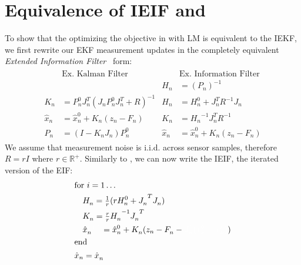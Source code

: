 

\section{Equivalence of IEIF and }
\label{app:ieif-lm}

To show that the optimizing the objective in  with LM is equivalent to the IEKF, we first rewrite our EKF measurement updates in the completely equivalent \emph{Extended Information Filter}~\cite{anderson1979optimal} form:
% 
\begin{gather*}
\begin{aligned}
&\text{Ex. Kalman Filter}                           &       &\text{Ex. Information Filter} \\
&                                                   &       H_n &= \left(P_n\right)^{-1} \\
K_n &= P_n^0 J_n^T(J_n P_n^0 J_n^T + R)^{-1}        &       H_n &= H_n^0 + J_n^T R^{-1} J_n \\
\hat{x}_n &= \hat{x}_n^0 + K_n(z_n - F_n)           &       K_n &= {H_n}^{-1} J_n^T R^{-1} \\
P_n &= (I - K_n J_n)P_n^0                           &       \hat{x}_n &= \hat{x}_n^0 + K_n (z_n - F_n)
\end{aligned}
\label{eq:ekf-eif}
\end{gather*}
%  
We assume that measurement noise is i.i.d. across sensor samples, therefore $R=rI$ where $r\in \mathbb{R}^+$. Similarly to , we can now write the IEIF, the iterated version of the EIF:
\begin{gather}
\begin{aligned}
&\text{for } i=1 \dots  \\
&\quad H_n^\textit{\color{accent}$i$} = \tfrac{1}{r} (r H_n^0 +{J_n^\textit{\color{accent}$i$}}^T J_n^\textit{\color{accent}$i$}) \\
&\quad K_n^\textit{\color{accent}$i$} =\tfrac{r}{r} {H_n^\textit{\color{accent}$i$}}^{-1} {J_n^\textit{\color{accent}$i$}}^T \\
&\quad \hat{x}_n^\textit{\color{accent}$i + 1$} = \hat{x}_n^0 + K_n^\textit{\color{accent}$i$}(z_n - F_n^\textit{\color{accent}$i$} - \textit{\color{accent} $J_n^i(\hat{x}_n^0 - \hat{x}_n^i)$}) \\
&\text{end} \\
&\hat{x}_n = \hat{x}_n^\textit{\color{accent}$i$}
\end{aligned}
\end{gather}


